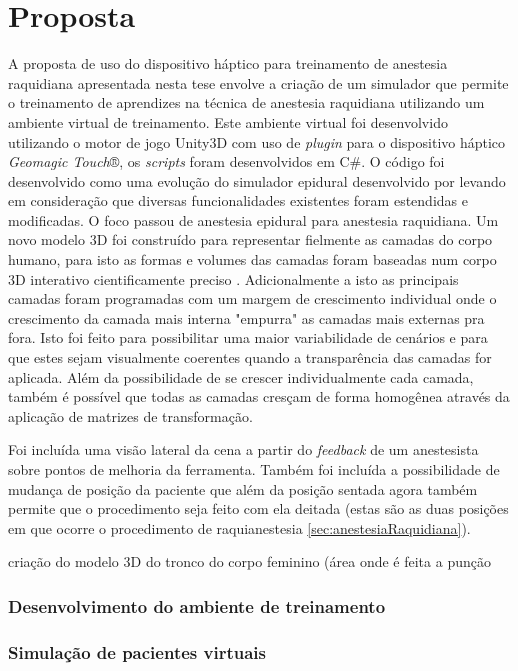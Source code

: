 \chapter{Proposta} \label{cap:cap4}

A proposta de uso do dispositivo háptico para treinamento de anestesia raquidiana apresentada nesta tese envolve a criação de um simulador que permite o treinamento de aprendizes na técnica de anestesia raquidiana utilizando um ambiente virtual de treinamento.
Este ambiente virtual foi desenvolvido utilizando o motor de jogo Unity3D com uso de \textit{plugin} para o dispositivo háptico \textit{Geomagic Touch}®, os \textit{scripts} foram desenvolvidos em C\#. O código foi desenvolvido como uma evolução do simulador epidural desenvolvido por \textcite{Brazil2017} levando em consideração que diversas funcionalidades existentes foram estendidas e modificadas. O foco passou de anestesia epidural para anestesia raquidiana. Um novo modelo 3D foi construído para representar fielmente as camadas do corpo humano, para isto as formas e volumes das camadas foram baseadas num corpo 3D interativo cientificamente preciso \cite{BioDigitalInc2019}. Adicionalmente a isto as principais camadas foram programadas com um margem de crescimento individual onde o crescimento da camada mais interna "empurra" as camadas mais externas pra fora. Isto foi feito para possibilitar uma maior variabilidade de cenários e para que estes sejam visualmente coerentes quando a transparência das camadas for aplicada. Além da possibilidade de se crescer individualmente cada camada, também é possível que todas as camadas cresçam de forma homogênea através da aplicação de matrizes de transformação. 

Foi incluída uma visão lateral da cena a partir do \textit{feedback} de um anestesista sobre pontos de melhoria da ferramenta. Também foi incluída a possibilidade de mudança de posição da paciente que além da posição sentada agora também permite que o procedimento seja feito com ela deitada (estas são as duas posições em que ocorre o procedimento de raquianestesia \ref{sec:anestesiaRaquidiana}).   

criação do modelo 3D do tronco do corpo feminino (área onde é feita a punção  

\subsection {Desenvolvimento do ambiente de treinamento} 

\subsection {Simulação de pacientes virtuais}
